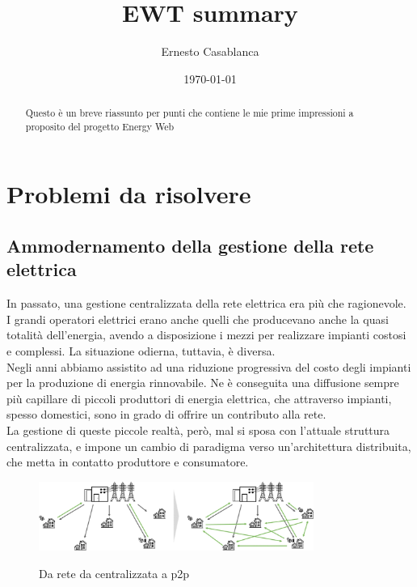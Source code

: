 \documentclass[12pt, letterpaper, twoside]{article}
\title{EWT summary}
\author{Ernesto Casablanca}
\date{\today}
\begin{document}

\tableofcontents

\newpage

\begin{abstract}
    Questo è un breve riassunto per punti che contiene le mie prime impressioni
    a proposito del progetto Energy Web
\end{abstract}

\section{Problemi da risolvere}

\subsection{Ammodernamento della gestione della rete elettrica}
In passato, una gestione centralizzata della rete elettrica era più che ragionevole.
I grandi operatori elettrici erano anche quelli che producevano anche la quasi totalità dell'energia, avendo a disposizione i mezzi per realizzare impianti costosi e complessi.
La situazione odierna, tuttavia, è diversa.\\
Negli anni abbiamo assistito ad una riduzione progressiva del costo degli impianti per la produzione di energia rinnovabile.
Ne è conseguita una diffusione sempre più capillare di piccoli produttori di energia elettrica, che attraverso impianti, spesso domestici, sono in grado di offrire un contributo alla rete.\\
La gestione di queste piccole realtà, però, mal si sposa con l'attuale struttura centralizzata, e impone un cambio di paradigma verso un'architettura distribuita, che metta in contatto produttore e consumatore.

\begin{figure}[h]
    \includegraphics[width=9cm]{p2pgrid.png}
    \centering
    \label{p2pgrid}
    \caption{Da rete da centralizzata a p2p \cite{img:p2pgrid}}
\end{figure}
\end{document}
